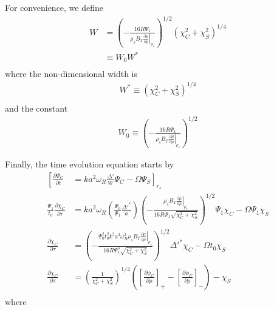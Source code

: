 \documentclass{article}
\begin{document}
For convenience, we define
\begin{equation} \label{}
\begin{split}
W &=  \left( -  \frac{16 R \Psi_1 }{\rho_s B_T \left.\frac{\partial \mu}{\partial \rho}\right|_{\rho_s}} \right)^{1/2} \left(\chi_C^2+\chi_S^2\right)^{1/4}\\
& \equiv W_0 W^*\\
\end{split} 
\end{equation} 
where the non-dimensional width is
\begin{equation} \label{}
\begin{split}
W^*\equiv \left(\chi_C^2+\chi_S^2\right)^{1/4}\\
\end{split} 
\end{equation} 
and the constant
\begin{equation} \label{}
\begin{split}
W_0 \equiv \left( -  \frac{16 R \Psi_1 }{\rho_s B_T \left.\frac{\partial \mu}{\partial \rho}\right|_{\rho_s}} \right)^{1/2}
\end{split} 
\end{equation} 


Finally, the time evolution equation starts by
\begin{equation} \label{wessonCurrentProfile}
\begin{split}
\left [  \frac{\partial \Psi_C}{\partial t}\right. & = \left. k a^2 \omega_R \frac{\Delta '}{W}\Psi_C - \Omega \Psi_S \right]_{r_s}\\
\frac{\Psi_1}{t_0}\frac{\partial \chi_C}{\partial \tau} & = k a^2 \omega_R \left(  \frac{\Psi_0}{\Psi_1}\frac{\Delta'^{*} }{a} \right)    \left( - \frac{\rho_s B_T \left.\frac{\partial \mu}{\partial \rho}\right|_{\rho_s}}{16 R \Psi_1 \sqrt{\chi_C^2+\chi_S^2} }\right)^{1/2}      \Psi_1 \chi_C - \Omega \Psi_1 \chi_S\\
\frac{\partial \chi_C}{\partial \tau} & =     \left( - \frac{\Psi_0^2 t_0^2 k^2 a^2 \omega_R^2 \rho_s B_T \left.\frac{\partial \mu}{\partial \rho}\right|_{\rho_s}}{16 R \Psi_1^3 \sqrt{\chi_C^2+\chi_S^2} }\right)^{1/2}  \Delta'^{*}    \chi_C - \Omega t_0 \chi_S\\
\frac{\partial \chi_C}{\partial \tau} & =     \left(  \frac{1}{\chi_C^2+\chi_S^2} \right)^{1/4}       \left( \left[\frac{\partial \phi_C}{\partial \rho}\right]_{+}-\left[\frac{\partial \phi_C}{\partial \rho}\right]_{-}    \right) - \chi_S\\
\end{split} 
\end{equation} 
where
\end{document}
